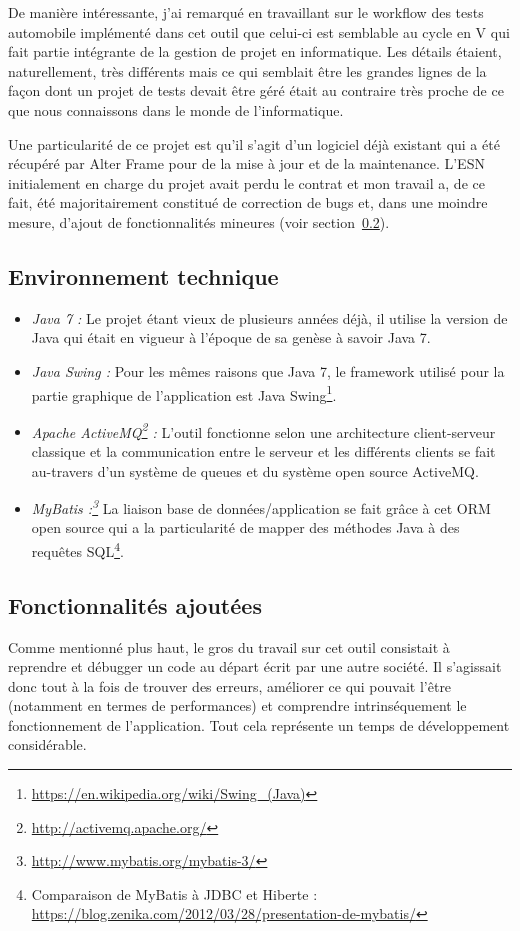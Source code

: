 De manière intéressante, j'ai remarqué en travaillant sur le workflow des tests automobile implémenté dans cet outil que celui-ci est semblable au cycle en V qui fait partie intégrante de la gestion de projet en informatique. Les détails étaient, naturellement, très différents mais ce qui semblait être les grandes lignes de la façon dont un projet de tests devait être géré était au contraire très proche de ce que nous connaissons dans le monde de l'informatique.

Une particularité de ce projet est qu'il s'agit d'un logiciel déjà existant qui a été récupéré par Alter Frame pour de la mise à jour et de la maintenance. L'ESN initialement en charge du projet avait perdu le contrat et mon travail a, de ce fait, été majoritairement constitué de correction de bugs et, dans une moindre mesure, d'ajout de fonctionnalités mineures (voir section~\ref{subsec:ajout}).

\subsection{Environnement technique}
\begin{itemize}[label=$\bullet$]
	\item \emph{Java 7 :} Le projet étant vieux de plusieurs années déjà, il utilise la version de Java qui était en vigueur à l'époque de sa genèse à savoir Java 7.
	\item \emph{Java Swing :} Pour les mêmes raisons que Java 7, le framework utilisé pour la partie graphique de l'application est Java Swing\footnote{\url{https://en.wikipedia.org/wiki/Swing_(Java)}}.
	\item \emph{Apache ActiveMQ\footnote{\url{http://activemq.apache.org/}} :} L'outil fonctionne selon une architecture client-serveur classique et la communication entre le serveur et les différents clients se fait au-travers d'un système de queues et du système open source ActiveMQ.
	\item \emph{MyBatis :\footnote{\url{http://www.mybatis.org/mybatis-3/}}} La liaison base de données/application se fait grâce à cet ORM open source qui a la particularité de mapper des méthodes Java à des requêtes SQL\footnote{Comparaison de MyBatis à JDBC et Hiberte : \url{https://blog.zenika.com/2012/03/28/presentation-de-mybatis/}}.
\end{itemize}

\subsection{Fonctionnalités ajoutées}
\label{subsec:ajout}
Comme mentionné plus haut, le gros du travail sur cet outil consistait à reprendre et débugger un code au départ écrit par une autre société. Il s'agissait donc tout à la fois de trouver des erreurs, améliorer ce qui pouvait l'être (notamment en termes de performances) et comprendre intrinséquement le fonctionnement de l'application. Tout cela représente un temps de développement considérable.

